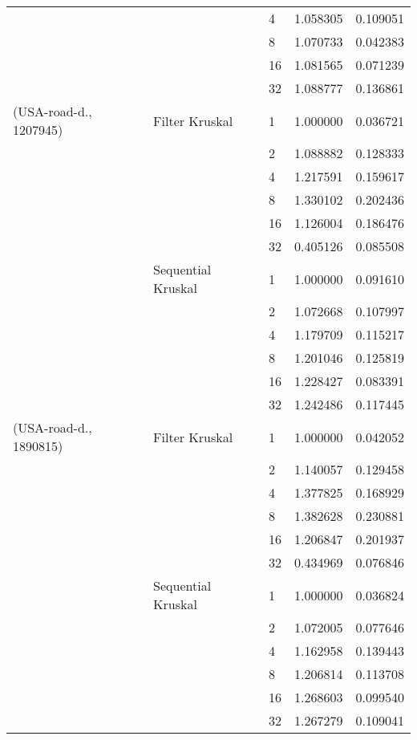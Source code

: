 \begin{tabular}{lllrr}
                       &                    & 4  &  1.058305 &  0.109051 \\
                       &                    & 8  &  1.070733 &  0.042383 \\
                       &                    & 16 &  1.081565 &  0.071239 \\
                       &                    & 32 &  1.088777 &  0.136861 \\
(USA-road-d., 1207945) & Filter Kruskal & 1  &  1.000000 &  0.036721 \\
                       &                    & 2  &  1.088882 &  0.128333 \\
                       &                    & 4  &  1.217591 &  0.159617 \\
                       &                    & 8  &  1.330102 &  0.202436 \\
                       &                    & 16 &  1.126004 &  0.186476 \\
                       &                    & 32 &  0.405126 &  0.085508 \\
                       & Sequential Kruskal & 1  &  1.000000 &  0.091610 \\
                       &                    & 2  &  1.072668 &  0.107997 \\
                       &                    & 4  &  1.179709 &  0.115217 \\
                       &                    & 8  &  1.201046 &  0.125819 \\
                       &                    & 16 &  1.228427 &  0.083391 \\
                       &                    & 32 &  1.242486 &  0.117445 \\
(USA-road-d., 1890815) & Filter Kruskal & 1  &  1.000000 &  0.042052 \\
                       &                    & 2  &  1.140057 &  0.129458 \\
                       &                    & 4  &  1.377825 &  0.168929 \\
                       &                    & 8  &  1.382628 &  0.230881 \\
                       &                    & 16 &  1.206847 &  0.201937 \\
                       &                    & 32 &  0.434969 &  0.076846 \\
                       & Sequential Kruskal & 1  &  1.000000 &  0.036824 \\
                       &                    & 2  &  1.072005 &  0.077646 \\
                       &                    & 4  &  1.162958 &  0.139443 \\
                       &                    & 8  &  1.206814 &  0.113708 \\
                       &                    & 16 &  1.268603 &  0.099540 \\
                       &                    & 32 &  1.267279 &  0.109041 \\
\bottomrule
\end{tabular}
